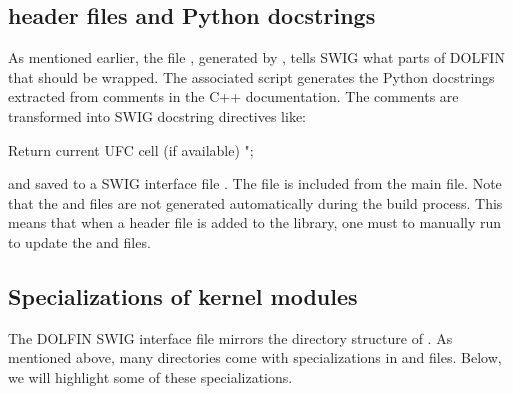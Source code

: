 \subsection{\dolfin{} header files and Python docstrings}
As mentioned earlier, the file , generated
by , tells SWIG what parts of DOLFIN that should be
wrapped.  The associated script  generates
the Python docstrings extracted from comments in the C++ documentation.
The comments are transformed into SWIG docstring directives like:
\begin{swigcode}
Return current UFC cell (if available)
";
\end{swigcode}
and saved to a SWIG interface file . The
 file is included from the main  file.
Note that the  and  files
are not generated automatically during the build process. This means
that when a header file is added to the \dolfin{} library, one must to
manually run  to update the 
and  files.


\subsection{Specializations of kernel modules}
The DOLFIN SWIG interface file  mirrors the directory
structure of \dolfin{}. As mentioned above, many directories come
with specializations in  and 
files.  Below, we will highlight some of these specializations.


